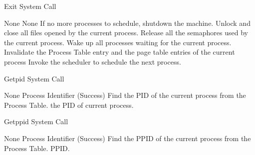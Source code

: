 
\begin{algorithm}
\caption{Exit System Call}
\begin{algorithmic}
\REQUIRE None
\ENSURE None
\STATE If no more processes to schedule, shutdown the machine.    
\STATE Unlock and close all files opened by the current process.   
\STATE Release all the semaphores used by the current process.     
\STATE Wake up all processes waiting for the current process.     
\STATE Invalidate the Process Table entry and the page table entries of the current process
\STATE Invoke the scheduler to schedule the next process.  
\end{algorithmic}
\end{algorithm}


\begin{algorithm}
\caption{Getpid System Call}
\begin{algorithmic}
\REQUIRE None
\ENSURE Process Identifier (Success) 
\STATE Find the PID of the current process from the Process Table.
\RETURN the PID of current process. 
\end{algorithmic}
\end{algorithm}


\begin{algorithm}
\caption{Getppid System Call}
\begin{algorithmic}
\REQUIRE None
\ENSURE Process Identifier (Success) 
 \STATE Find the PPID of the current process from the Process Table.
\RETURN PPID.
\end{algorithmic}
\end{algorithm}


